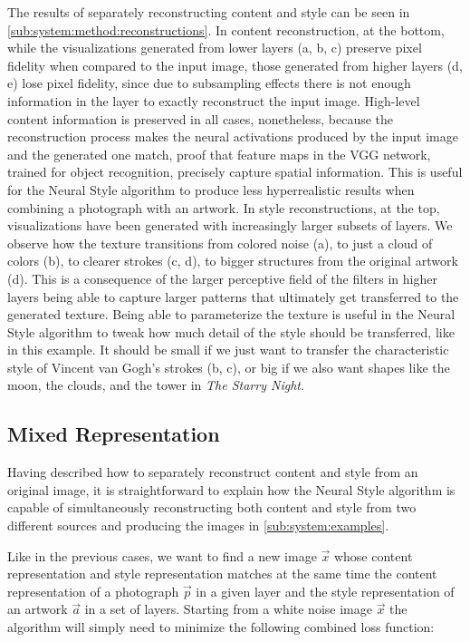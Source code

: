 The results of separately reconstructing content and style can be seen in \autoref{sub:system:method:reconstructions}.
In content reconstruction, at the bottom, while the visualizations generated from lower layers (a, b, c) preserve pixel fidelity when compared to the input image, those generated from higher layers (d, e) lose pixel fidelity, since due to subsampling effects there is not enough information in the layer to exactly reconstruct the input image.
High-level content information is preserved in all cases, nonetheless, because the reconstruction process makes the neural activations produced by the input image and the generated one match, proof that feature maps in the VGG network, trained for object recognition, precisely capture spatial information.
This is useful for the Neural Style algorithm to produce less hyperrealistic results when combining a photograph with an artwork.
In style reconstructions, at the top, visualizations have been generated with increasingly larger subsets of layers.
We observe how the texture transitions from colored noise (a), to just a cloud of colors (b), to clearer strokes (c, d), to bigger structures from the original artwork (d).
This is a consequence of the larger perceptive field of the filters in higher layers being able to capture larger patterns that ultimately get transferred to the generated texture.
Being able to parameterize the texture is useful in the Neural Style algorithm to tweak how much detail of the style should be transferred, like in this example.
It should be small if we just want to transfer the characteristic style of Vincent van Gogh's strokes (b, c), or big if we also want shapes like the moon, the clouds, and the tower in \emph{The Starry Night}.


\subsection{Mixed Representation}
\label{sub:system:method:mixed-representation}

Having described how to separately reconstruct content and style from an original image, it is straightforward to explain how the Neural Style algorithm is capable of simultaneously reconstructing both content and style from two different sources and producing the images in \autoref{sub:system:examples}.

Like in the previous cases, we want to find a new image $\vec{x}$ whose content representation and style representation matches at the same time the content representation of a photograph $\vec{p}$ in a given layer and the style representation of an artwork $\vec{a}$ in a set of layers.
Starting from a white noise image $\vec{x}$ the algorithm will simply need to minimize the following combined loss function:

